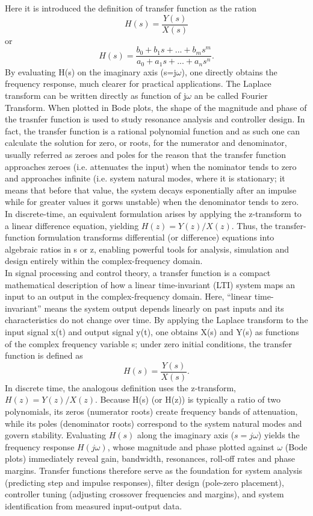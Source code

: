 Here it is introduced the definition of transfer function as the ration
$$
H(s)= \frac{Y(s)}{X(s)} 
$$
or
$$
H(s) = \frac{b_0 + b_1 s + ... + b_m s^m}{a_0 + a_1 s + ... + a_n s^n}.  
$$
By evaluating H(s) on the imaginary axis (s=j$\omega$), one directly obtains the frequency response, much clearer for practical applications. The Laplace transform can be written directly as function of j$\omega$ an be called Fourier Transform.
When plotted in Bode plots, the shape of the magnitude and phase of the trasnfer function is used to study resonance analysis and controller design. In fact, the transfer function is a rational polynomial function and as such one can calculate the solution for zero, or roots, for the numerator and denominator, usually referred as zeroes and poles for the reason that the transfer function approaches zeroes (i.e. attenuates the input) when the nominator tends to zero and approaches infinite (i.e. system natural modes, where it is stationary; it means that before that value, the system decays esponentially after an impulse while for greater values it gorws unstable) when the denominator tends to zero.
In discrete-time, an equivalent formulation arises by applying the z-transform to a linear difference equation, yielding $H(z)=Y(z)/X(z)$.  Thus, the transfer-function formulation transforms differential (or difference) equations into algebraic ratios in s or z, enabling powerful tools for analysis, simulation and design entirely within the complex-frequency domain.\\
In signal processing and control theory, a transfer function is a compact mathematical description of how a linear time-invariant (LTI) system maps an input to an output in the complex-frequency domain. Here, “linear time-invariant” means the system output depends linearly on past inputs and its characteristics do not change over time. By applying the Laplace transform to the input signal x(t) and output signal y(t), one obtains X(s) and Y(s) as functions of the complex frequency variable s; under zero initial conditions, the transfer function is defined as
$$
H(s) = \frac{Y(s)} {X(s)}.
$$
In discrete time, the analogous definition uses the z-transform, $H(z) = Y(z)/X(z)$. Because H(s) (or H(z)) is typically a ratio of two polynomials, its zeros (numerator roots) create frequency bands of attenuation, while its poles (denominator roots) correspond to the system natural modes and govern stability. Evaluating $H(s)$ along the imaginary axis ($s = j\omega$) yields the frequency response $H(j\omega)$, whose magnitude and phase plotted against $\omega$ (Bode plots) immediately reveal gain, bandwidth, resonances, roll-off rates and phase margins. Transfer functions therefore serve as the foundation for system analysis (predicting step and impulse responses), filter design (pole-zero placement), controller tuning (adjusting crossover frequencies and margins), and system identification from measured input-output data.


